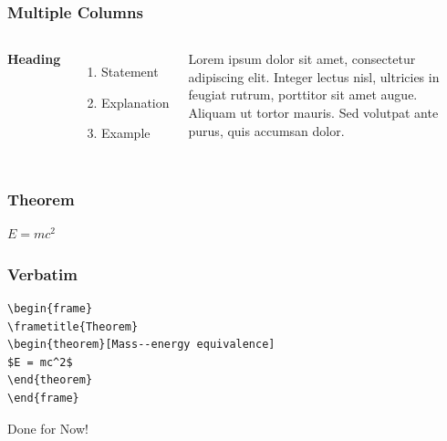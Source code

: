 \documentclass[12pt]{beamer}\usepackage[]{graphicx}\usepackage[]{color}
\begin{document}
\begin{frame}
\frametitle{Multiple Columns}
\begin{columns}[c] %

\textbf{Heading}
\begin{enumerate}
\item Statement
\item Explanation
\item Example
\end{enumerate}

Lorem ipsum dolor sit amet, consectetur adipiscing elit. Integer lectus nisl, ultricies in feugiat rutrum, porttitor sit amet augue. Aliquam ut tortor mauris. Sed volutpat ante purus, quis accumsan dolor.

\end{columns}
\end{frame}


\begin{frame}
\frametitle{Theorem}
\begin{theorem}
$E = mc^2$
\end{theorem}
\end{frame}

\begin{frame}[fragile] %
\frametitle{Verbatim}
\begin{example}
\begin{verbatim}
\begin{frame}
\frametitle{Theorem}
\begin{theorem}[Mass--energy equivalence]
$E = mc^2$
\end{theorem}
\end{frame}\end{verbatim}
\end{example}
\end{frame}

\begin{frame}
\Huge{\centerline{Done for Now!}}
\end{frame}

\end{document}
